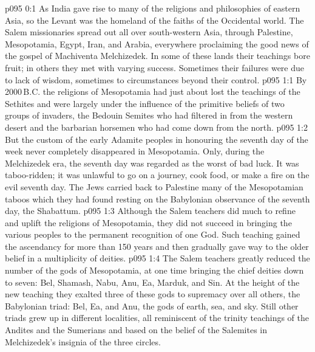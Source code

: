 \author{Melchizedek}
\vs p095 0:1 As India gave rise to many of the religions and philosophies of eastern Asia, so the Levant was the homeland of the faiths of the Occidental world. The Salem missionaries spread out all over south\hyp{}western Asia, through Palestine, Mesopotamia, Egypt, Iran, and Arabia, everywhere proclaiming the good news of the gospel of Machiventa Melchizedek. In some of these lands their teachings bore fruit; in others they met with varying success. Sometimes their failures were due to lack of wisdom, sometimes to circumstances beyond their control.
\vs p095 1:1 By 2000\,B.C. the religions of Mesopotamia had just about lost the teachings of the Sethites and were largely under the influence of the primitive beliefs of two groups of invaders, the Bedouin Semites who had filtered in from the western desert and the barbarian horsemen who had come down from the north.
\vs p095 1:2 But the custom of the early Adamite peoples in honouring the seventh day of the week never completely disappeared in Mesopotamia. Only, during the Melchizedek era, the seventh day was regarded as the worst of bad luck. It was taboo\hyp{}ridden; it was unlawful to go on a journey, cook food, or make a fire on the evil seventh day. The Jews carried back to Palestine many of the Mesopotamian taboos which they had found resting on the Babylonian observance of the seventh day, the Shabattum.
\vs p095 1:3 Although the Salem teachers did much to refine and uplift the religions of Mesopotamia, they did not succeed in bringing the various peoples to the permanent recognition of one God. Such teaching gained the ascendancy for more than 150 years and then gradually gave way to the older belief in a multiplicity of deities.
\vs p095 1:4 The Salem teachers greatly reduced the number of the gods of Mesopotamia, at one time bringing the chief deities down to seven: Bel, Shamash, Nabu, Anu, Ea, Marduk, and Sin. At the height of the new teaching they exalted three of these gods to supremacy over all others, the Babylonian triad: Bel, Ea, and Anu, the gods of earth, sea, and sky. Still other triads grew up in different localities, all reminiscent of the trinity teachings of the Andites and the Sumerians and based on the belief of the Salemites in Melchizedek’s insignia of the three circles.
